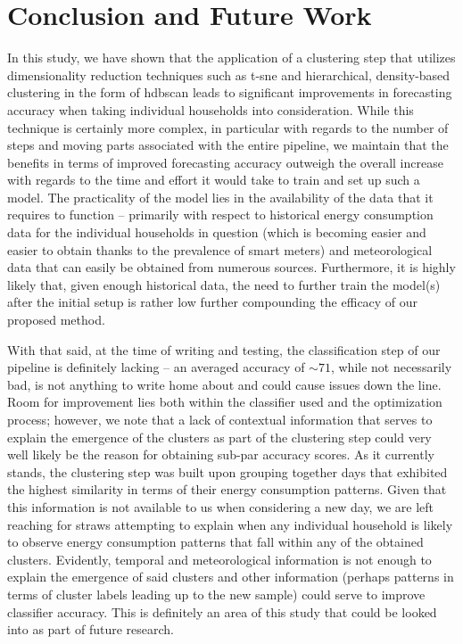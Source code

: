 \chapter{Conclusion and Future Work}
\label{ch:Conclusion-and-Future-Work}
In this study, we have shown that the application of a clustering step that utilizes dimensionality reduction techniques such as \gls{t-sne} and hierarchical, density-based clustering in the form of \gls{hdbscan} leads to significant improvements in forecasting accuracy when taking individual households into consideration. While this technique is certainly more complex, in particular with regards to the number of steps and moving parts associated with the entire pipeline, we maintain that the benefits in terms of improved forecasting accuracy outweigh the overall increase with regards to the time and effort it would take to train and set up such a model. The practicality of the model lies in the availability of the data that it requires to function -- primarily with respect to historical energy consumption data for the individual households in question (which is becoming easier and easier to obtain thanks to the prevalence of smart meters) and meteorological data that can easily be obtained from numerous sources. Furthermore, it is highly likely that, given enough historical data, the need to further train the model(s) after the initial setup is rather low further compounding the efficacy of our proposed method.

\noindent \newline With that said, at the time of writing and testing, the classification step of our pipeline is definitely lacking -- an averaged accuracy of $\sim 71$, while not necessarily bad, is not anything to write home about and could cause issues down the line. Room for improvement lies both within the classifier used and the optimization process; however, we note that a lack of contextual information that serves to explain the emergence of the clusters as part of the clustering step could very well likely be the reason for obtaining sub-par accuracy scores. As it currently stands, the clustering step was built upon grouping together days that exhibited the highest similarity in terms of their energy consumption patterns. Given that this information is not available to us when considering a new day, we are left reaching for straws attempting to explain when any individual household is likely to observe energy consumption patterns that fall within any of the obtained clusters. Evidently, temporal and meteorological information is not enough to explain the emergence of said clusters and other information (perhaps patterns in terms of cluster labels leading up to the new sample) could serve to improve classifier accuracy. This is definitely an area of this study that could be looked into as part of future research.

